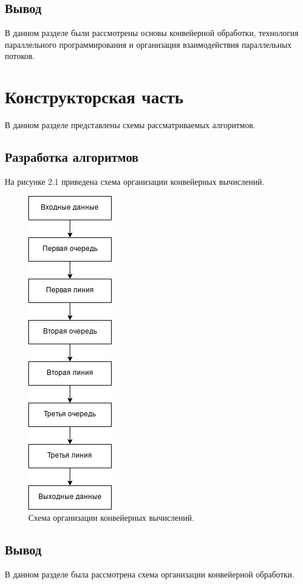 \documentclass[12pt]{report}
\begin{document}
\section*{Вывод}
В данном разделе были рассмотрены основы конвейерной обработки, технология параллельного программирования и
организация взаимодействия параллельных потоков.


\newpage
\chapter{Конструкторская часть}
В данном разделе представлены схемы рассматриваемых алгоритмов.

\section{Разработка алгоритмов}
На рисунке 2.1 приведена схема организации конвейерных вычислений.

\begin{figure}[h]
	\centering
	\includegraphics[scale=0.6]{imgs/scheme_lab05.jpg}
	\caption{Схема организации конвейерных вычислений.}
	\label{fig:mpr}
\end{figure}

\section*{Вывод}
В данном разделе была рассмотрена схема организации конвейерной обработки.
\end{document}
